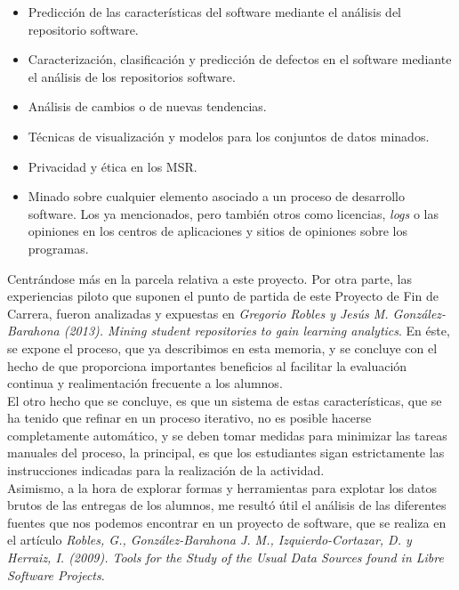 \begin{itemize}
\item Predicción de las características del software mediante el análisis del repositorio software.

\item Caracterización, clasificación y predicción de defectos en el software mediante el análisis de los repositorios software.

\item Análisis de cambios o de nuevas tendencias.

\item Técnicas de visualización y modelos para los conjuntos de datos minados.

\item Privacidad y ética en los MSR.

\item Minado sobre cualquier elemento asociado a un proceso de desarrollo software. Los ya mencionados, pero también otros como licencias, \textit{logs} o las opiniones en los centros de aplicaciones y sitios de opiniones sobre los programas.
\end{itemize}


Centrándose más en la parcela relativa a este proyecto. Por otra parte, las experiencias piloto que suponen el punto de partida de este Proyecto de Fin de Carrera, fueron analizadas y expuestas en \textit{Gregorio Robles y Jesús M. González-Barahona (2013). Mining student repositories to gain learning analytics}. En éste, se expone el proceso, que ya describimos en esta memoria, y se concluye con el hecho de que proporciona importantes beneficios al facilitar la evaluación continua y realimentación frecuente a los alumnos.\\


El otro hecho que se concluye, es que un sistema de estas características, que se ha tenido que refinar en un proceso iterativo, no es posible hacerse completamente automático, y se deben tomar medidas para minimizar las tareas manuales del proceso, la principal, es que los estudiantes sigan estrictamente las instrucciones indicadas para la realización de la actividad.\\


Asimismo, a la hora de explorar formas y herramientas para explotar los datos brutos de las entregas de los alumnos, me resultó útil el análisis de las diferentes fuentes que nos podemos encontrar en un proyecto de software, que se realiza en el artículo \textit{Robles, G., González-Barahona J. M., Izquierdo-Cortazar, D. y Herraiz, I. (2009). Tools for the Study of the Usual Data Sources found in Libre Software Projects}.\\


